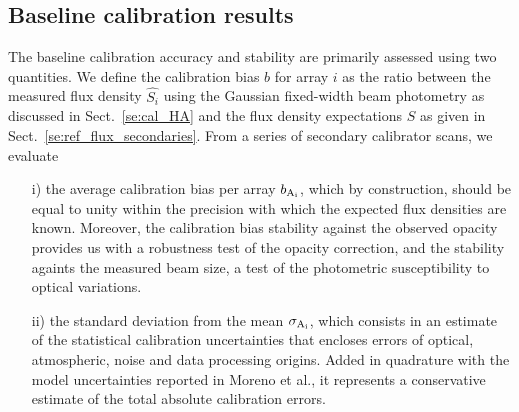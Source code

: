 %
%
%
\subsection{Baseline calibration results}

The baseline calibration accuracy and stability are primarily assessed
using two quantities. We define the calibration bias $b$ for array $i$ as
the ratio between the measured flux density $\hat{S_{i}}$ using the
Gaussian fixed-width beam photometry as discussed in
Sect.~\ref{se:cal_HA} and the flux density expectations $\hat{S}$ as
given in Sect.~\ref{se:ref_flux_secondaries}. From a series of
secondary calibrator scans, we evaluate
\begin{itemize}
\item[i)] the average calibration bias per array $b_{\rm A_i}$,
  which by construction, should be equal to unity within the precision
  with which the expected flux densities are known. Moreover, 
  the calibration bias stability against the observed opacity provides
  us with a robustness test of the opacity correction, and the stability
  againts the measured beam size, a test of the photometric
  susceptibility to optical variations. %
\item[ii)] the standard deviation from the mean $\sigma_{\rm A_i}$,
  which consists in an estimate of the statistical calibration
  uncertainties that encloses errors of optical, atmospheric, noise
  and data processing origins. Added in quadrature with the model
  uncertainties reported in Moreno et al., it represents a
  conservative estimate of the total absolute calibration errors.
\end{itemize}
  
  


